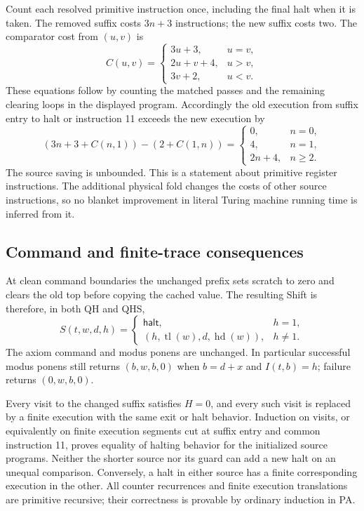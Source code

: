 Count each resolved primitive instruction once, including the final halt
when it is taken. The removed suffix costs $3n+3$ instructions; the new
suffix costs two. The comparator cost from $(u,v)$ is
\[
 C(u,v)=\begin{cases}
 3u+3,&u=v,\\
 2u+v+4,&u>v,\\
 3v+2,&u<v.
 \end{cases}
\]
These equations follow by counting the matched passes and the remaining
clearing loops in the displayed program. Accordingly the old execution
from suffix entry to halt or instruction 11 exceeds the new execution by
\[
 (3n+3+C(n,1))-(2+C(1,n))
 =\begin{cases}
 0,&n=0,\\
 4,&n=1,\\
 2n+4,&n\ge2.
 \end{cases}
\]
The source saving is unbounded. This is a statement about primitive
register instructions. The additional physical fold changes the costs of
other source instructions, so no blanket improvement in literal Turing
machine running time is inferred from it.

\subsection{Command and finite-trace consequences}

At clean command boundaries the unchanged prefix sets scratch to zero
and clears the old top before copying the cached value. The resulting
Shift is therefore, in both QH and QHS,
\[
 S(t,w,d,h)=\begin{cases}
 \mathsf{halt},&h=1,\\
 (h,\operatorname{tl}(w),d,\operatorname{hd}(w)),&h\ne1.
 \end{cases}
\]
The axiom command and modus ponens are unchanged. In particular successful
modus ponens still returns $(b,w,b,0)$ when
$b=d+x$ and $I(t,b)=h$; failure returns $(0,w,b,0)$.

Every visit to the changed suffix satisfies $H=0$, and every such visit
is replaced by a finite execution with the same exit or halt behavior.
Induction on visits, or equivalently on finite execution segments cut at
suffix entry and common instruction 11, proves equality of halting
behavior for the initialized source programs. Neither the shorter source
nor its guard can add a new halt on an unequal comparison. Conversely,
a halt in either source has a finite corresponding execution in the other.
All counter recurrences and finite execution translations are primitive
recursive; their correctness is provable by ordinary induction in PA.

